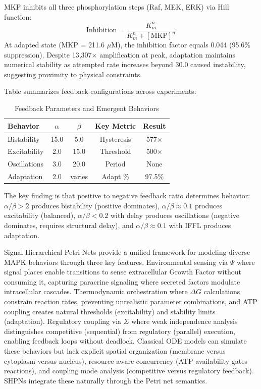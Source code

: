 \documentclass[twocolumn,11pt]{article}
\begin{document}
MKP inhibits all three phosphorylation steps (Raf, MEK, ERK) via Hill function:
\begin{equation}
\text{Inhibition} = \frac{K_m^n}{K_m^n + [\text{MKP}]^n}
\end{equation}
At adapted state (MKP = 211.6 $\mu$M), the inhibition factor equals 0.044 (95.6\% suppression). Despite 13,307× amplification at peak, adaptation maintains numerical stability as attempted rate increases beyond 30.0 caused instability, suggesting proximity to physical constraints.

Table summarizes feedback configurations across experiments:

\begin{table}[h]
\centering
\scriptsize
\caption{Feedback Parameters and Emergent Behaviors}
\label{tab:feedback_summary}
\begin{tabular}{@{}lcccc@{}}
\toprule
\textbf{Behavior} & $\alpha$ & $\beta$ & \textbf{Key Metric} & \textbf{Result} \\
\midrule
Bistability & 15.0 & 5.0 & Hysteresis & 577× \\
Excitability & 2.0 & 15.0 & Threshold & 500× \\
Oscillations & 3.0 & 20.0 & Period & None \\
Adaptation & 2.0 & varies & Adapt \% & 97.5\% \\
\bottomrule
\end{tabular}
\end{table}

The key finding is that positive to negative feedback ratio determines behavior: $\alpha/\beta > 2$ produces bistability (positive dominates), $\alpha/\beta \approx 0.1$ produces excitability (balanced), $\alpha/\beta < 0.2$ with delay produces oscillations (negative dominates, requires structural delay), and $\alpha/\beta \approx 0.1$ with IFFL produces adaptation.

Signal Hierarchical Petri Nets provide a unified framework for modeling diverse MAPK behaviors through three key features. Environmental sensing via $\Psi$ where signal places enable transitions to sense extracellular Growth Factor without consuming it, capturing paracrine signaling where secreted factors modulate intracellular cascades. Thermodynamic orchestration where $\Delta G$ calculations constrain reaction rates, preventing unrealistic parameter combinations, and ATP coupling creates natural thresholds (excitability) and stability limits (adaptation). Regulatory coupling via $\Sigma$ where weak independence analysis distinguishes competitive (sequential) from regulatory (parallel) execution, enabling feedback loops without deadlock. Classical ODE models can simulate these behaviors but lack explicit spatial organization (membrane versus cytoplasm versus nucleus), resource-aware concurrency (ATP availability gates reactions), and coupling mode analysis (competitive versus regulatory feedback). SHPNs integrate these naturally through the Petri net semantics.
\end{document}
